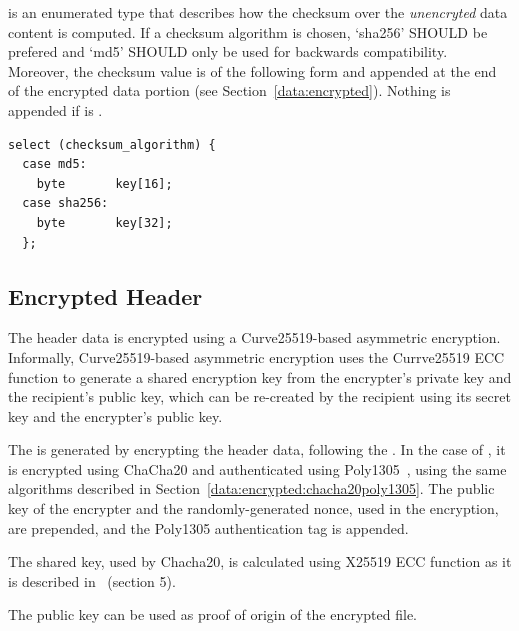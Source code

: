  is an enumerated type that describes how the checksum over the \emph{unencryted} data content is computed.
%
If a checksum algorithm is chosen, `sha256' SHOULD be prefered and `md5' SHOULD only be used for backwards compatibility.
%
Moreover, the checksum value is of the following form and appended at the end of the encrypted data portion (see Section~\ref{data:encrypted}). Nothing is appended if  is .
%
\begin{verbatim}
select (checksum_algorithm) {
  case md5:
    byte       key[16];
  case sha256:
    byte       key[32];
  };
\end{verbatim}



\subsection{Encrypted Header}\label{header:encrypted}

The header data is encrypted using a Curve25519-based asymmetric encryption.
%
Informally, Curve25519-based asymmetric encryption uses the Currve25519 ECC function to generate a shared encryption key from the encrypter's private key and the recipient's public key, which can be re-created by the recipient using its secret key and the encrypter's public key.
%

The  is generated by encrypting the header data, following the .
%
In the case of , it is encrypted using ChaCha20 and authenticated using Poly1305~\cite{RFC8439}, using the same algorithms described in Section~\ref{data:encrypted:chacha20poly1305}.
%
The public key of the encrypter and the randomly-generated nonce, used in the encryption, are prepended, and the Poly1305 authentication tag is appended.


The shared key, used by Chacha20, is calculated using X25519 ECC function as it is described in~\cite{RFC7748} (section 5).
%

The public key can be used as proof of origin of the encrypted file.
%
